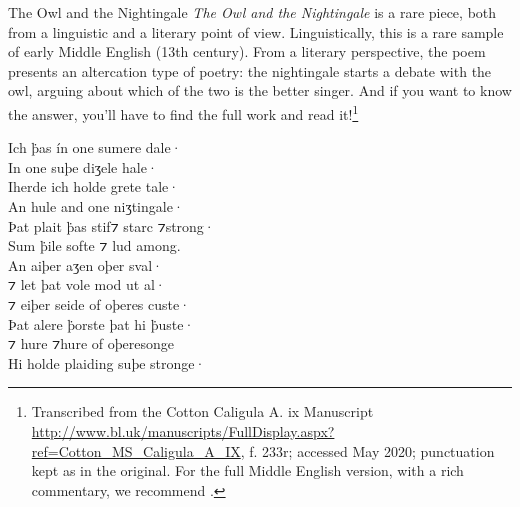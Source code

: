 \largerpage
\begin{texts}{The Owl and the Nightingale}\label{ME-owl}
\textit{The Owl and the Nightingale} is a rare piece, both from a linguistic and a literary point of view. Linguistically, this is a rare sample of early Middle English (13th century). From a literary perspective, the poem presents an altercation type of poetry: the nightingale starts a debate with the owl, arguing about which of the two is the better singer. And if you want to know the answer, you'll have to find the full work and read it!\footnote{Transcribed from the Cotton Caligula A. ix Manuscript \url{http://www.bl.uk/manuscripts/FullDisplay.aspx?ref=Cotton_MS_Caligula_A_IX}, f. 233r; accessed May 2020; punctuation kept as in the original. For the full Middle English version, with a rich commentary, we recommend \citet{Cartlidge2001}.}

\begin{textglossed}
  \internallinenumbers*{}
Ich \.{þ}as ín one sumere dale·\\
In one suþe diʒele hale·\\
Iherde ich holde grete tale·\\
An hule and one niʒtingale·\\
Þat plait \.{þ}as stif⁊ starc ⁊strong·\\
Sum \.{þ}ile softe ⁊ lud among.\\
An aiþer aʒen oþer sval·\\
⁊ let þat vole mod ut al·\\
⁊ eiþer seide of oþeres custe·\\
Þat alere \.{þ}orste þat hi \.{þ}uste·\\
⁊ hure ⁊hure of oþeresonge\\
Hi holde plaiding suþe stronge·
  

\end{textglossed}
\end{texts}
